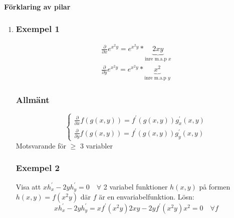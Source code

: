 \documentclass{article}
\begin{document}
\paragraph{Förklaring av pilar}
\begin{enumerate}
	\item \subsubsection*{Exempel 1}
	\[
	\begin{split}
		\frac{\partial}{\partial x} e^{x^2 y} = e^{x^2 y}*\underbrace{2xy}_{\text{inre m.a.p }x} \\
		\frac{\partial}{\partial y} e^{x^2 y} = e^{x^2 y}*\underbrace{x^2}_{\text{inre m.a.p }y}
	\end{split}
	\]
	\subsubsection*{Allmänt}
	\[
		\left\{\begin{array}{rcl}
		\frac{\partial}{\partial x} f(g(x,y)) = f^{\prime}(g(x,y))g_{x}^{\prime}(x,y) \\
		\frac{\partial}{\partial y} f(g(x,y)) = f^{\prime}(g(x,y))g_{y}^{\prime}(x,y)
		\end{array}\right.
	\]
	Motsvarande för \(\geq\) 3 variabler
	\subsubsection*{Exempel 2}
	Visa att \(xh_{x}^{\prime} - 2yh_{y}^{\prime} = 0 \quad \forall\) 2 variabel funktioner \(h(x,y)\) 
	på formen \(h(x,y) = f(x^2y)\) där \(f\) är en envariabelfunktion. Lösn:
	\[
		xh_{x}^{\prime} - 2yh_{y}^{\prime} = xf^{\prime}(x^2y)2xy - 2yf^{\prime}(x^2y)x^2 = 0 \quad \forall f
	\]
	

\end{enumerate}
\end{document}
